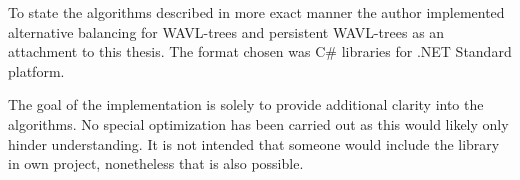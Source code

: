 To state the algorithms described in more exact manner the author implemented alternative balancing for WAVL-trees and persistent WAVL-trees as an attachment to this thesis. The format chosen was C\# libraries for .NET Standard platform.

The goal of the implementation is solely to provide additional clarity into the algorithms. No special optimization has been carried out as this would likely only hinder understanding. It is not intended that someone would include the library in own project, nonetheless that is also possible.